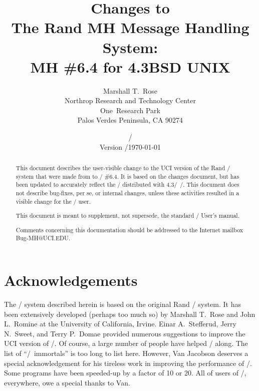 



\setcounter{page}{0}
\pagestyle{empty}



\title{Changes to\\ The Rand MH Message Handling System:\\
	MH \#6.4 for 4.3BSD UNIX}
\author{Marshall T.~Rose\\
	Northrop Research and Technology Center\\
	One~Research Park\\
	Palos Verdes Peninsula, CA  90274}
\date{\ifdraft \versiondate/\\ Version \versiontag/\else \today\fi}
\maketitle
{}%

\begin{abstract}
\noindent This document describes the user-visible change to the
UCI version of the Rand \MH/ system that were made from  to \MH/ \#6.4.
It is based on the  changes document,
but has been updated to accurately reflect the \MH/ distributed with
4.3\bsd/~\unix/.
This document does not describe bug-fixes, per se,
or internal changes,
unless these activities resulted in a visible change for the \MH/ user.

This document is meant to supplement,
not supersede, the standard \MH/ User's manual\cite{MH}.

Comments concerning this documentation should be addressed to the Internet
mailbox {\sf Bug-MH@UCI.EDU}.
\end{abstract}

\bop\pagestyle{plain}

\section*	{Acknowledgements}
The \MH/ system described herein is based on the original Rand \MH/ system.
It has been extensively developed (perhaps too much so) by Marshall T.~Rose
and John L.~Romine at the University of California, Irvine.
Einar A.~Stefferud, Jerry N.~Sweet,
and Terry P.~Domae provided numerous suggestions
to improve the UCI version of \MH/.
Of course,
a large number of people have helped \MH/ along.
The list of ``\MH/~immortals'' is too long to list here.
However, Van Jacobson deserves a special acknowledgement for his tireless
work in improving the performance of \MH/.
Some programs have been speeded-up by a factor of 10 or 20.
All of users of \MH/, everywhere, owe a special thanks to Van.

